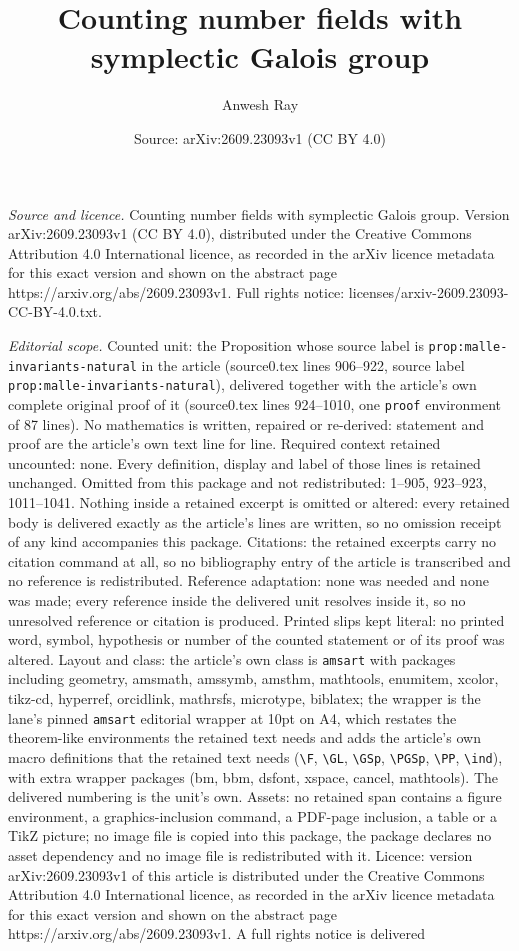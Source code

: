 \documentclass[10pt,a4paper]{amsart}
\title[Counting number fields with symplectic Galois group]{Counting number fields with symplectic Galois group}
\author{Anwesh Ray}
\date{Source: arXiv:2609.23093v1 (CC BY 4.0)}
\begin{document}
\maketitle

\noindent\emph{Source and licence.} Counting number fields with symplectic Galois group. Version arXiv:2609.23093v1 (CC BY 4.0), distributed under the Creative Commons Attribution 4.0 International licence, as recorded in the arXiv licence metadata for this exact version and shown on the abstract page https://arxiv.org/abs/2609.23093v1. Full rights notice: licenses/arxiv-2609.23093-CC-BY-4.0.txt.\par\smallskip

\noindent\textit{Editorial scope.} Counted unit: the Proposition whose source label is \texttt{prop:malle-invariants-natural} in the article (source0.tex lines 906--922, source label \texttt{prop:malle-invariants-natural}), delivered together with the article's own complete original proof of it (source0.tex lines 924--1010, one \texttt{proof} environment of 87 lines). No mathematics is written, repaired or re-derived: statement and proof are the article's own text line for line. Required context retained uncounted: none. Every definition, display and label of those lines is retained unchanged. Omitted from this package and not redistributed: 1--905, 923--923, 1011--1041. Nothing inside a retained excerpt is omitted or altered: every retained body is delivered exactly as the article's lines are written, so no omission receipt of any kind accompanies this package. Citations: the retained excerpts carry no citation command at all, so no bibliography entry of the article is transcribed and no reference is redistributed. Reference adaptation: none was needed and none was made; every reference inside the delivered unit resolves inside it, so no unresolved reference or citation is produced. Printed slips kept literal: no printed word, symbol, hypothesis or number of the counted statement or of its proof was altered. Layout and class: the article's own class is \texttt{amsart} with packages including geometry, amsmath, amssymb, amsthm, mathtools, enumitem, xcolor, tikz-cd, hyperref, orcidlink, mathrsfs, microtype, biblatex; the wrapper is the lane's pinned \texttt{amsart} editorial wrapper at 10pt on A4, which restates the theorem-like environments the retained text needs and adds the article's own macro definitions that the retained text needs (\texttt{\textbackslash F}, \texttt{\textbackslash GL}, \texttt{\textbackslash GSp}, \texttt{\textbackslash PGSp}, \texttt{\textbackslash PP}, \texttt{\textbackslash ind}), with extra wrapper packages (bm, bbm, dsfont, xspace, cancel, mathtools). The delivered numbering is the unit's own. Assets: no retained span contains a figure environment, a graphics-inclusion command, a PDF-page inclusion, a table or a TikZ picture; no image file is copied into this package, the package declares no asset dependency and no image file is redistributed with it. Licence: version arXiv:2609.23093v1 of this article is distributed under the Creative Commons Attribution 4.0 International licence, as recorded in the arXiv licence metadata for this exact version and shown on the abstract page https://arxiv.org/abs/2609.23093v1. A full rights notice is delivered 
\end{document}
